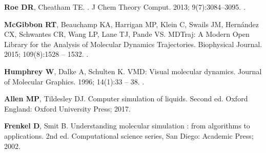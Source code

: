 \documentclass[9pt,bestpractices]{livecoms}
\providecommand{\DIFaddbegin}{} %
\providecommand{\DIFaddend}{} %
\providecommand{\DIFdelbegin}{} %
\providecommand{\DIFdelend}{} %
\begin{document}
\begin{thebibliography}{59}
\textbf{\color{LiveCoMSMediumGrey} Roe DR}, Cheatham TE.
.
\newblock J Chem Theory Comput.  2013; 9(7):3084--3095.
\newblock \href{https://dx.doi.org/10.1021/ct400341p}{\doiprefix
  }.

\textbf{\color{LiveCoMSMediumGrey} McGibbon RT}, Beauchamp KA, Harrigan MP,
  Klein C, Swails JM, Hernández CX, Schwantes CR, Wang LP, Lane TJ, Pande VS.
\newblock MDTraj: A Modern Open Library for the Analysis of Molecular Dynamics
  Trajectories.
\newblock Biophysical Journal.  2015; 109(8):1528 -- 1532.
\newblock \DIFdelbegin %
\DIFdelend \DIFaddbegin \href{https://dx.doi.org/10.1016/j.bpj.2015.08.015}{\doiprefix
  }\DIFaddend .

\textbf{\color{LiveCoMSMediumGrey} Humphrey W}, Dalke A, Schulten K.
\newblock VMD: Visual molecular dynamics.
\newblock Journal of Molecular Graphics.  1996; 14(1):33 -- 38.
\newblock \DIFdelbegin %
\DIFdelend \DIFaddbegin \href{https://dx.doi.org/10.1016/0263-7855(96)00018-5}{\doiprefix
  }\DIFaddend .

\textbf{\color{LiveCoMSMediumGrey} Allen MP}, Tildesley DJ.
\newblock Computer simulation of liquids.
\newblock Second ed. Oxford England: Oxford University Press; 2017.

\textbf{\color{LiveCoMSMediumGrey} Frenkel D}, Smit B.
\newblock Understanding molecular simulation : from algorithms to applications.
\newblock 2nd ed. Computational science series, San Diego: Academic Press;
  2002.


\end{thebibliography}
\end{document}
